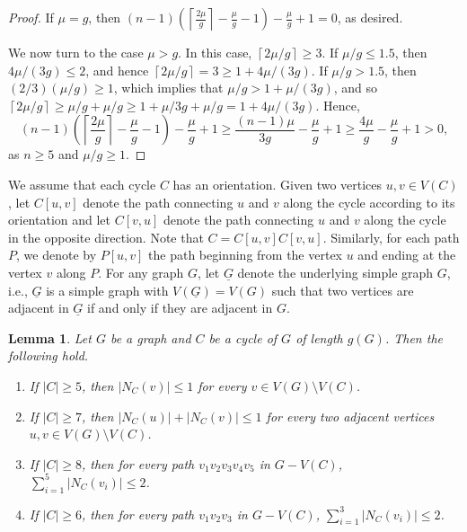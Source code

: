 \documentclass[12pt,oneside]{amsart}
\newtheorem{lemma}[theorem]{Lemma}
\newcommand\roundup[1]{\left\lceil#1\right\rceil}
\begin{document}
\begin{proof}
If $\mu =g$, then
$
(n-1)\left(\roundup{\frac{2\mu}g}-\frac {\mu}g -1\right) -\frac {\mu}g +1= 0$, as desired.

We now turn to the case $\mu >g$. In this case, $\roundup{2\mu/g} \ge 3$. If $\mu/g \le 1.5$,  then $4\mu/(3g) \le 2$, and hence $\roundup{2\mu/g} =3\ge 1 +4\mu/(3g)$.  If $\mu/g > 1.5$, then $(2/3) (\mu/g) \ge 1$, which implies that $\mu/g > 1 + \mu/(3g)$, and so $\roundup{2\mu/g} \ge \mu/g +\mu/g \ge 1+\mu/3g + \mu/g = 1 +4\mu/(3g)$.
Hence,
\[
(n-1)\left(\roundup{\frac{2\mu}g}-\frac {\mu}g -1\right) -\frac {\mu}g +1\ge \frac{(n-1)\mu}{3g} -\frac{\mu}g +1 \ge \frac {4\mu} g -\frac {\mu}g +1  > 0,
\]
as $n \ge 5$ and $\mu/g \ge 1$.
\end{proof}



We assume that each cycle $C$ has an orientation. Given two vertices $u, v\in V(C)$, let $C[u,v]$ denote the path connecting $u$ and $v$ along
the cycle according to its orientation  and let $C[v,u]$ denote the path connecting $u$ and $v$ along the cycle in the opposite direction. Note that $C=C[u,v]C[v,u]$. Similarly, for each path $P$, we 
denote by $P[u,v]$ the path beginning from the vertex $u$ and ending at the vertex $v$ along 
$P$. For any graph $G$, let $\underline{G}$ denote the underlying simple graph $G$, i.e., $\underline{G}$ is a simple graph with $V(\underline{G}) = V(G)$ such that  two vertices are adjacent in $\underline{G}$ if and only if they are adjacent in $G$.




\begin{lemma}\label{lem-shortcycle}
 Let $G$ be a graph and $C$ be a cycle of $G$ of length $g(G)$.
 Then the following hold.
 \begin{enumerate}
     \item If $|C| \ge 5$, then $|N_C(v)| \le 1$ for every $v\in V(G) \setminus V(C)$.
     \item If $|C| \ge 7$, then $|N_C(u)| + |N_C(v)| \le 1$ for every two adjacent vertices $u, v\in V(G)\setminus V(C)$.
     \item If $|C| \ge 8$, then for every path $v_1v_2v_3v_4v_5$ in $G-V(C)$,
     $\sum_{i=1}^5 |N_C(v_i)| \le 2$.
     \item If $|C| \ge 6$, then for every path $v_1v_2v_3$ in $G-V(C)$, $\sum_{i=1}^3 |N_C(v_i)| \le 2$.
 \end{enumerate}
\end{lemma}
\end{document}

